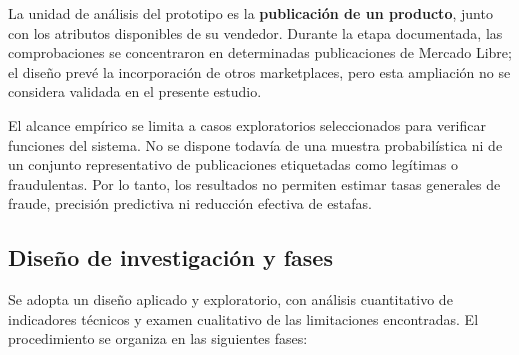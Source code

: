 La unidad de análisis del prototipo es la \textbf{publicación de un producto}, junto con los atributos disponibles de su vendedor. Durante la etapa documentada, las comprobaciones se concentraron en determinadas publicaciones de Mercado Libre; el diseño prevé la incorporación de otros marketplaces, pero esta ampliación no se considera validada en el presente estudio.

El alcance empírico se limita a casos exploratorios seleccionados para verificar funciones del sistema. No se dispone todavía de una muestra probabilística ni de un conjunto representativo de publicaciones etiquetadas como legítimas o fraudulentas. Por lo tanto, los resultados no permiten estimar tasas generales de fraude, precisión predictiva ni reducción efectiva de estafas.

\subsection{Diseño de investigación y fases}\label{subsec:ml-fases-investigacion}

Se adopta un diseño aplicado y exploratorio, con análisis cuantitativo de indicadores técnicos y examen cualitativo de las limitaciones encontradas. El procedimiento se organiza en las siguientes fases:

